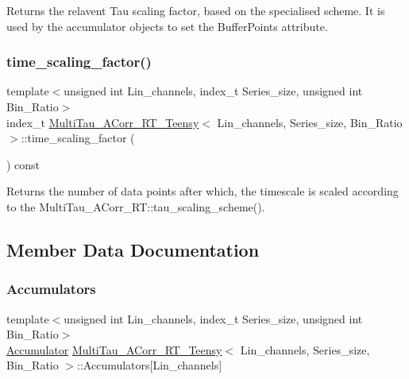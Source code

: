 Returns the relavent Tau scaling factor, based on the specialised scheme. It is used by the accumulator objects to set the Buffer\+Points attribute. 

\mbox{\label{classMultiTau__ACorr__RT__Teensy_a218fdc2fcc3bb7cd5d1c2f03ea2506da}} 
\subsubsection{\texorpdfstring{time\+\_\+scaling\+\_\+factor()}{time\_scaling\_factor()}}
{\footnotesize\ttfamily template$<$unsigned int Lin\+\_\+channels, index\+\_\+t Series\+\_\+size, unsigned int Bin\+\_\+\+Ratio$>$ \\
index\+\_\+t \hyperlink{classMultiTau__ACorr__RT__Teensy}{Multi\+Tau\+\_\+\+A\+Corr\+\_\+\+R\+T\+\_\+\+Teensy}$<$ Lin\+\_\+channels, Series\+\_\+size, Bin\+\_\+\+Ratio $>$\+::time\+\_\+scaling\+\_\+factor (\begin{DoxyParamCaption}{ }\end{DoxyParamCaption}) const\hspace{0.3cm}{\ttfamily [inline]}}

Returns the number of data points after which, the timescale is scaled according to the Multi\+Tau\+\_\+\+A\+Corr\+\_\+\+R\+T\+::tau\+\_\+scaling\+\_\+scheme(). 

\subsection{Member Data Documentation}
\mbox{\label{classMultiTau__ACorr__RT__Teensy_a5b6f2659e905f143bc898a9b803eae24}} 
\subsubsection{\texorpdfstring{Accumulators}{Accumulators}}
{\footnotesize\ttfamily template$<$unsigned int Lin\+\_\+channels, index\+\_\+t Series\+\_\+size, unsigned int Bin\+\_\+\+Ratio$>$ \\
\hyperlink{classAccumulator}{Accumulator} \hyperlink{classMultiTau__ACorr__RT__Teensy}{Multi\+Tau\+\_\+\+A\+Corr\+\_\+\+R\+T\+\_\+\+Teensy}$<$ Lin\+\_\+channels, Series\+\_\+size, Bin\+\_\+\+Ratio $>$\+::Accumulators\mbox{[}Lin\+\_\+channels\mbox{]}\hspace{0.3cm}{\ttfamily [private]}}

